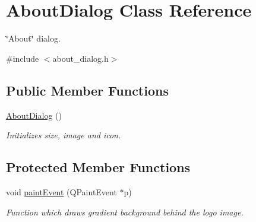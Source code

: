 \hypertarget{class_about_dialog}{\section{About\-Dialog Class Reference}
\label{class_about_dialog}
}


\char`\"{}\-About\char`\"{} dialog.  




{\ttfamily \#include $<$about\-\_\-dialog.\-h$>$}

\subsection*{Public Member Functions}
\begin{DoxyCompactItemize}
\item 
\hyperlink{class_about_dialog_a7cf07155b3981ae606f5d6d304b04916}{About\-Dialog} ()
\begin{DoxyCompactList}\small\item\em Initializes size, image and icon. \end{DoxyCompactList}\end{DoxyCompactItemize}
\subsection*{Protected Member Functions}
\begin{DoxyCompactItemize}
\item 
void \hyperlink{class_about_dialog_a3bf2e8a107b5c47b29df30931698a819}{paint\-Event} (Q\-Paint\-Event $\ast$p)
\begin{DoxyCompactList}\small\item\em Function which draws gradient background behind the logo image. \end{DoxyCompactList}\end{DoxyCompactItemize}

